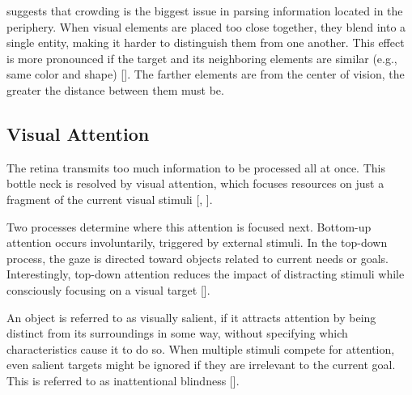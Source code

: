 \textcite{rosenholtzCapabilitiesLimitationsPeripheral2016} suggests that crowding is the biggest issue in parsing information located in the periphery. When visual elements are placed too close together, they blend into a single entity, making it harder to distinguish them from one another. This effect is more pronounced if the target and its neighboring elements are similar (e.g., same color and shape) [\cite{pelliUncrowdedWindowObject2008}]. The farther elements are from the center of vision, the greater the distance between them must be.

\subsection{Visual Attention}
\label{subsec:vis_attention}

The retina transmits too much information to be processed all at once. This bottle neck is resolved by visual attention, which focuses resources on just a fragment of the current visual stimuli [\cite{andersonDirectedVisualAttention2005}, \cite{rosenholtzCapabilitiesLimitationsPeripheral2016}].

Two processes determine where this attention is focused next. Bottom-up attention occurs involuntarily, triggered by external stimuli. 
In the top-down process, the gaze is directed toward objects related to current needs or goals. Interestingly, top-down attention reduces the impact of distracting stimuli while consciously focusing on a visual target [\cite{connorVisualAttentionBottomUp2004}].

An object is referred to as visually salient, if it attracts attention by being distinct from its surroundings in some way, without specifying which characteristics cause it to do so.
When multiple stimuli compete for attention, even salient targets might be ignored if they are irrelevant to the current goal. This is referred to as inattentional blindness [\cite{jensenChangeBlindnessInattentional2011}]. 
